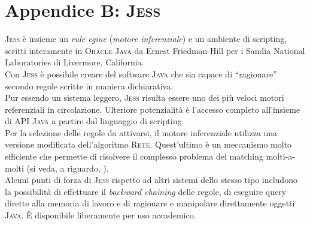 \chapter*{Appendice B: \textsc{Jess}}
\textsc{Jess} è insieme un \emph{rule egine} (\emph{motore inferenziale}) e un ambiente di scripting, scritti interamente in \textsc{Oracle Java} da Ernest Friedman-Hill per i Sandia National Laboratories di Livermore, California.\\
Con \textsc{Jess} è possibile creare del software \textsc{Java} che sia capace di ``ragionare'' secondo regole scritte in maniera dichiarativa.\\
Pur essendo un sistema leggero, \textsc{Jess} risulta essere uno dei più veloci motori referenziali in circolazione. Ulteriore potenzialità è l'accesso completo all'insieme di API \textsc{Java} a partire dal linguaggio di scripting.\\
Per la selezione delle regole da attivarsi, il motore inferenziale utilizza una versione modificata dell'algoritmo \textsc{Rete}.
Quest'ultimo è un meccanismo molto efficiente che permette di risolvere il complesso problema del matching molti-a-molti  (si veda, a riguardo, \cite{rete}).\\
Alcuni punti di forza di \textsc{Jess} rispetto ad altri sistemi dello stesso tipo includono la possibilità di effettuare il \emph{backward chaining} delle regole, di eseguire query dirette alla memoria di lavoro e di ragionare e manipolare direttamente oggetti \textsc{Java}.
È disponibile liberamente per uso accademico.

